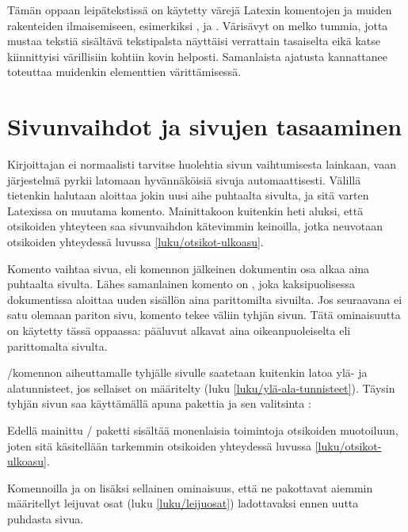 Tämän oppaan leipätekstissä on käytetty värejä Latexin komentojen ja
muiden rakenteiden ilmaisemiseen, esimerkiksi ,
 ja . Värisävyt on melko tummia,
jotta mustaa tekstiä sisältävä tekstipalsta näyttäisi verrattain
tasaiselta eikä katse kiinnittyisi värillisiin kohtiin kovin helposti.
Samanlaista ajatusta kannattanee toteuttaa muidenkin elementtien
värittämisessä.

\section{Sivunvaihdot ja sivujen tasaaminen}
\label{luku/sivunvaihdot}

Kirjoittajan ei normaalisti tarvitse huolehtia sivun vaihtumisesta
lainkaan, vaan järjestelmä pyrkii latomaan hyvännäköisiä sivuja
automaattisesti. Välillä tietenkin halutaan aloittaa jokin uusi aihe
puhtaalta sivulta, ja sitä varten Latexissa on muutama komento.
Mainittakoon kuitenkin heti aluksi, että otsikoiden yhteyteen saa
sivunvaihdon kätevimmin keinoilla, jotka neuvotaan otsikoiden yhteydessä
luvussa \ref{luku/otsikot-ulkoasu}.

Komento  vaihtaa sivua, eli komennon jälkeinen
dokumentin osa alkaa aina puhtaalta sivulta. Lähes samanlainen komento
on , joka kaksipuolisessa dokumentissa
aloittaa uuden sisällön aina parittomilta sivuilta. Jos seuraavana ei
satu olemaan pariton sivu, komento tekee väliin tyhjän sivun. Tätä
ominaisuutta on käytetty tässä oppaassa: pääluvut alkavat aina
oikeanpuoleiselta eli parittomalta sivulta.

\-/komennon aiheuttamalle tyhjälle sivulle
saatetaan kuitenkin latoa ylä- ja alatunnisteet, jos sellaiset on
määritelty (luku \ref{luku/ylä-ala-tunnisteet}). Täysin tyhjän sivun saa
käyttämällä apuna pakettia  ja sen valitsinta
:

\begin{koodilohkosis}
\usepackage[clearempty]{titlesec}
\end{koodilohkosis}

\noindent
Edellä mainittu \-/ paketti sisältää monenlaisia
toimintoja otsikoiden muotoiluun, joten sitä käsitellään tarkemmin
otsikoiden yhteydessä luvussa \ref{luku/otsikot-ulkoasu}.

Komennoilla  ja  on lisäksi
sellainen ominaisuus, että ne pakottavat aiemmin määritellyt leijuvat
osat (luku \ref{luku/leijuosat}) ladottavaksi ennen uutta puhdasta
sivua.

